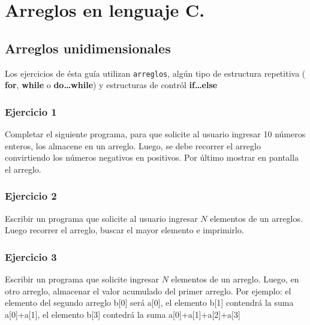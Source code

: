 \section{Arreglos en lenguaje C.}

\subsection*{Arreglos unidimensionales}
\setcounter{subsection}{6}

Los ejercicios de ésta guía utilizan \texttt{arreglos}, algún tipo de estructura repetitiva ( \textbf{for}, \textbf{while} o \textbf{do\dots while})
y estructuras de contról \textbf{if\dots else}

\subsubsection{Ejercicio 1} 
Completar el siguiente programa, para que solicite al usuario ingresar 10 números enteros, los almacene en un arreglo. Luego, se debe recorrer el arreglo convirtiendo los números negativos en positivos. Por último mostrar en pantalla el arreglo.
\lstset{inputencoding=utf8/latin1}

{\small
  \lstset{inputencoding=utf8/latin1}
  
}

\subsubsection{Ejercicio 2} 
Escribir un programa que solicite al usuario ingresar $N$ elementos de un arreglos. Luego recorrer el arreglo, buscar el mayor elemento e imprimirlo.
{\small
  \lstset{inputencoding=utf8/latin1}
  
}

\subsubsection{Ejercicio 3} 
Escribir un programa que solicite ingresar $N$ elementos de un arreglo. Luego, en otro arreglo, almacenar el valor acumulado del primer arreglo. Por ejemplo: el elemento del segundo arreglo b[0] será a[0], el elemento b[1] contendrá la suma a[0]+a[1], el elemento b[3] contedrá la suma a[0]+a[1]+a[2]+a[3]
{\small
  \lstset{inputencoding=utf8/latin1}
  
}

